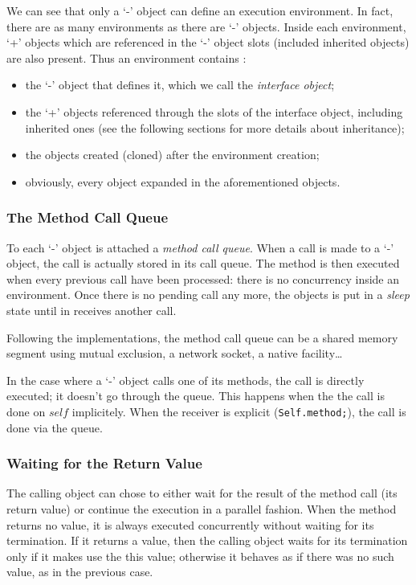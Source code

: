 \documentclass[11pt]{mybook}
\begin{document}
We can see that only a `-' object can define an execution environment.
In fact, there are as many environments as there are `-' objects.
Inside each environment, `+' objects which are referenced in the `-'
object slots (included inherited objects) are also present.  Thus an
environment contains : 
\begin{itemize}
  \item the `-' object that defines it, which we call the
  \emph{interface object}; 
  \item the `+' objects referenced through the slots of the interface
  object, including inherited ones (see the following sections for
  more details about inheritance); 
  \item the objects created (cloned) after the environment creation;
  \item obviously, every object expanded in the aforementioned objects.
\end{itemize}

\subsubsection{The Method Call Queue}

To each `-' object is attached a \emph{method call queue}.  When a
call is made to a `-' object, the call is actually stored in its call
queue.  The method is then executed when every previous call have been
processed: there is no concurrency inside an environment.  Once there
is no pending call any more, the objects is put in a \emph{sleep}
state until in receives another call. 

Following the implementations, the method call queue can be a shared
memory segment using mutual exclusion, a network socket, a native
facility\dots 

In the case where a `-' object calls one of its methods, the call is
directly executed; it doesn't go through the queue.  This happens when
the the call is done on $self$ implicitely.  When the receiver is
explicit (\verb!Self.method;!), the call is done via the queue. 

\subsubsection{Waiting for the Return Value}

The calling object can chose to either wait for the result of the
method call (its return value) or continue the execution in a parallel
fashion.  When the method returns no value, it is always executed
concurrently without waiting for its termination.  If it returns a
value, then the calling object waits for its termination only if it
makes use the this value; otherwise it behaves as if there was no such
value, as in the previous case. 
\end{document}
